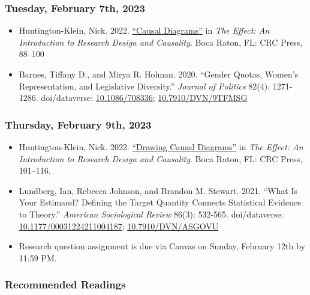\documentclass[12pt,]{article}
\begin{document}
\hypertarget{tuesday-february-7th-2023}{%
\subsubsection{Tuesday, February 7th,
2023}\label{tuesday-february-7th-2023}}

\begin{itemize}
\item
  Huntington-Klein, Nick. 2022.
  \href{https://theeffectbook.net/ch-CausalDiagrams.html}{``Causal
  Diagrams''} in \emph{The Effect: An Introduction to Research Design
  and Causality}. Boca Raton, FL: CRC Press, 88--100
\item
  Barnes, Tiffany D., and Mirya R. Holman. 2020. ``Gender Quotas,
  Women's Representation, and Legislative Diversity.'' \emph{Journal of
  Politics} 82(4): 1271-1286. doi/dataverse:
  \href{https://doi.org/10.1086/708336}{10.1086/708336};
  \href{https://dataverse.harvard.edu/dataset.xhtml?persistentId=doi:10.7910/DVN/9TFMSG}{10.7910/DVN/9TFMSG}
\end{itemize}

\hypertarget{thursday-february-9th-2023}{%
\subsubsection{Thursday, February 9th,
2023}\label{thursday-february-9th-2023}}

\begin{itemize}
\item
  Huntington-Klein, Nick. 2022.
  \href{https://theeffectbook.net/ch-CausalPaths.html}{``Drawing Causal
  Diagrams''} in \emph{The Effect: An Introduction to Research Design
  and Causality}. Boca Raton, FL: CRC Press, 101--116.
\item
  Lundberg, Ian, Rebecca Johnson, and Brandon M. Stewart. 2021. ``What
  Is Your Estimand? Defining the Target Quantity Connects Statistical
  Evidence to Theory.'' \emph{American Sociological Review} 86(3):
  532-565. doi/dataverse:
  \href{https://doi.org/10.1177/00031224211004187}{10.1177/00031224211004187};
  \href{https://dataverse.harvard.edu/dataset.xhtml?persistentId=doi:10.7910/DVN/ASGOVU}{10.7910/DVN/ASGOVU}
\item
  Research question assignment is due via Canvas on Sunday, February
  12th by 11:59 PM.
\end{itemize}

\hypertarget{recommended-readings-2}{%
\subsubsection{Recommended Readings}\label{recommended-readings-2}}
\end{document}
